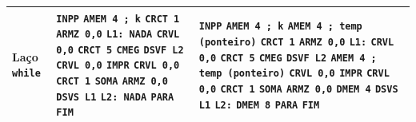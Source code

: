 \documentclass[12pt,a4paper]{article}
\begin{document}
\begin{longtable}{p{2.6cm}p{6.4cm}p{6.4cm}}
\textbf{Laço \texttt{while}} &
\texttt{INPP}\newline
\texttt{AMEM 4 ; k}\newline
\texttt{CRCT 1}\newline
\texttt{ARMZ 0,0}\newline
\texttt{L1: NADA}\newline
\texttt{CRVL 0,0}\newline
\texttt{CRCT 5}\newline
\texttt{CMEG}\newline
\texttt{DSVF L2}\newline
\texttt{CRVL 0,0}\newline
\texttt{IMPR}\newline
\texttt{CRVL 0,0}\newline
\texttt{CRCT 1}\newline
\texttt{SOMA}\newline
\texttt{ARMZ 0,0}\newline
\texttt{DSVS L1}\newline
\texttt{L2: NADA}\newline
\texttt{PARA}\newline
\texttt{FIM} &
\texttt{INPP}\newline
\texttt{AMEM 4 ; k}\newline
\texttt{AMEM 4 ; temp (ponteiro)}\newline
\texttt{CRCT 1}\newline
\texttt{ARMZ 0,0}\newline
\texttt{L1:}\newline
\texttt{CRVL 0,0}\newline
\texttt{CRCT 5}\newline
\texttt{CMEG}\newline
\texttt{DSVF L2}\newline
\texttt{AMEM 4 ; temp (ponteiro)}\newline
\texttt{CRVL 0,0}\newline
\texttt{IMPR}\newline
\texttt{CRVL 0,0}\newline
\texttt{CRCT 1}\newline
\texttt{SOMA}\newline
\texttt{ARMZ 0,0}\newline
\texttt{DMEM 4}\newline
\texttt{DSVS L1}\newline
\texttt{L2:}\newline
\texttt{DMEM 8}\newline
\texttt{PARA}\newline
\texttt{FIM} \\
\midrule


\end{longtable}
\end{document}
